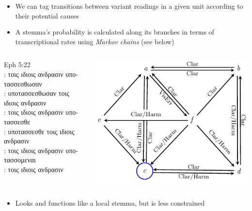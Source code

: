 \documentclass[10pt]{beamer}
\begin{document}
	\begin{frame}
		\begin{itemize}
			\item We can tag transitions between variant readings in a given unit according to their potential causes
			\item A stemma's probability is calculated along its branches in terms of transcriptional rates using \emph{Markov chains} (see below)
		\end{itemize}
		\begin{columns}[T]
			\begin{column}{0.5\textwidth}
				\footnotesize
				Eph 5:22\\
				\vspace{\baselineskip}
				: \textgreek{τοις ιδιοις ανδρασιν υποτασσεσθωσαν}\\
				: \textgreek{υποτασσεσθωσαν τοις ιδιοις ανδρασιν}\\
				: \textgreek{τοις ιδιοις ανδρασιν υποτασσεσθε}\\
				: \textgreek{υποτασσεσθε τοις ιδιοις ανδρασιν}\\
				: \textgreek{τοις ιδιοις ανδρασιν υποτασσομεναι}\\
				: \textgreek{τοις ιδιοις ανδρασιν} 
			\end{column}
			\begin{column}{0.5\textwidth}
				\includegraphics[scale=0.75]{../img/K5V22U6-12-transcriptional-probabilities.pdf}
			\end{column}
		\end{columns}
		\begin{itemize}
			\item Looks and functions like a local stemma, but is less constrained
		\end{itemize}
	\end{frame}
\end{document}
